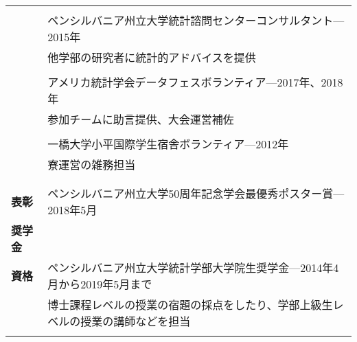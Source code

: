 \documentclass[utf8,letterpaper,oneside]{article}
\begin{document}
\begin{center}
\begin{tabular}{l l}
                      &                                                                                                \\
                      & ペンシルバニア州立大学統計諮問センターコンサルタント---2015年                                  \\
                      & 他学部の研究者に統計的アドバイスを提供                                                         \\
                      &                                                                                                \\
                      & アメリカ統計学会データフェスボランティア---2017年、2018年                                      \\
                      & 参加チームに助言提供、大会運営補佐                                                             \\
                      &                                                                                                \\
                      & 一橋大学小平国際学生宿舎ボランティア---2012年                                                  \\
                      & 寮運営の雑務担当                                                                               \\
                      &                                                                                                
  \\\hline
                      &                                                                                                \\
  \textbf{表彰}       & ペンシルバニア州立大学50周年記念学会最優秀ポスター賞---2018年5月                               \\
  \textbf{奨学金}
                      &                                                                                                \\
  \textbf{資格}       & ペンシルバニア州立大学統計学部大学院生奨学金---2014年4月から2019年5月まで                      \\
                      & 博士課程レベルの授業の宿題の採点をしたり、学部上級生レベルの授業の講師などを担当               \\
                      &                                                                                                \\

\end{tabular}
\end{center}
\end{document}
